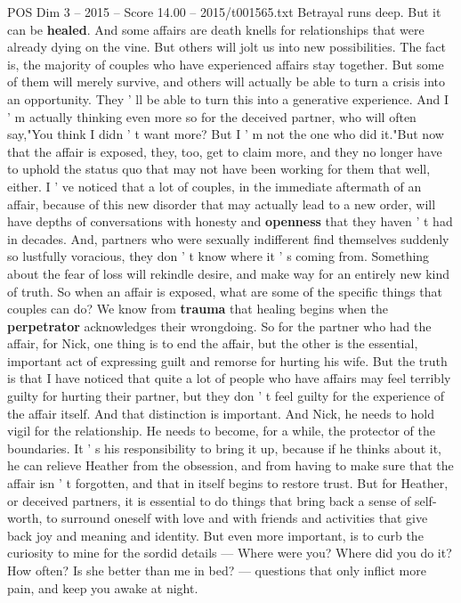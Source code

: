 \begin{textsample}{POS Dim 3 – 2015 – Score 14.00 – 2015/t001565.txt}
Betrayal runs deep.
But it can be \textbf{healed}.
And some affairs are death knells for relationships that were already dying on the vine.
But others will jolt us into new possibilities.
The fact is, the majority of couples who have experienced affairs stay together.
But some of them will merely survive, and others will actually be able to turn a crisis into an opportunity.
They ' ll be able to turn this into a generative experience.
And I ' m actually thinking even more so for the deceived partner, who will often say,"You think I didn ' t want more?
But I ' m not the one who did it."But now that the affair is exposed, they, too, get to claim more, and they no longer have to uphold the status quo that may not have been working for them that well, either.
I ' ve noticed that a lot of couples, in the immediate aftermath of an affair, because of this new disorder that may actually lead to a new order, will have depths of conversations with honesty and \textbf{openness} that they haven ' t had in decades.
And, partners who were sexually indifferent find themselves suddenly so lustfully voracious, they don ' t know where it ' s coming from.
Something about the fear of loss will rekindle desire, and make way for an entirely new kind of truth.
So when an affair is exposed, what are some of the specific things that couples can do?
We know from \textbf{trauma} that healing begins when the \textbf{perpetrator} acknowledges their wrongdoing.
So for the partner who had the affair, for Nick, one thing is to end the affair, but the other is the essential, important act of expressing guilt and remorse for hurting his wife.
But the truth is that I have noticed that quite a lot of people who have affairs may feel terribly guilty for hurting their partner, but they don ' t feel guilty for the experience of the affair itself.
And that distinction is important.
And Nick, he needs to hold vigil for the relationship.
He needs to become, for a while, the protector of the boundaries.
It ' s his responsibility to bring it up, because if he thinks about it, he can relieve Heather from the obsession, and from having to make sure that the affair isn ' t forgotten, and that in itself begins to restore trust.
But for Heather, or deceived partners, it is essential to do things that bring back a sense of self-worth, to surround oneself with love and with friends and activities that give back joy and meaning and identity.
But even more important, is to curb the curiosity to mine for the sordid details — Where were you?
Where did you do it?
How often?
Is she better than me in bed? — questions that only inflict more pain, and keep you awake at night.

\end{textsample}
